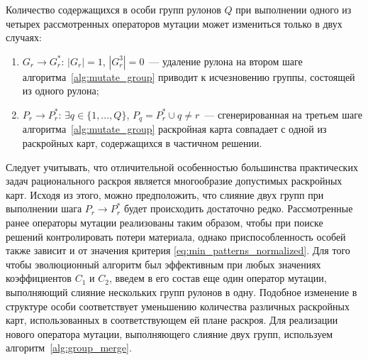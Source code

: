 \documentclass[12pt]{article}
\begin{document}
Количество содержащихся в особи групп рулонов $Q$ при выполнении одного из 
четырех рассмотренных операторов мутации может измениться только в двух 
случаях:
\begin{enumerate}
    \item $G_r \rightarrow G_r^*$: $|G_r|=1$, $|G_r^3|=0$~--- удаление рулона 
    на втором шаге алгоритма~\ref{alg:mutate_group} приводит к исчезновению 
    группы, состоящей из одного рулона;
    \item $P_r \rightarrow P_r^*$: $\exists q \in \{1,\ldots,Q\}$, 
        $P_q=P_r^* \cup q \neq r$~--- 
    сгенерированная на третьем шаге алгоритма~\ref{alg:mutate_group} 
    раскройная карта совпадает с одной из раскройных карт, содержащихся в 
    частичном решении.
\end{enumerate}

Следует учитывать, что отличительной особенностью большинства практических 
задач рационального раскроя является многообразие допустимых раскройных карт. 
Исходя из этого, можно предположить, что слияние двух групп при выполнении 
шага $P_r \rightarrow P_r^*$ будет происходить достаточно редко. Рассмотренные 
ранее операторы мутации реализованы таким образом, чтобы при поиске решений 
контролировать потери материала, однако приспособленность особей также зависит 
и от значения критерия 
\eqref{eq:min_patterns_normalized}. 
Для того чтобы эволюционный алгоритм был 
эффективным при любых значениях коэффициентов $C_1$ и $C_2$, введем в его 
состав еще один оператор мутации, выполняющий слияние нескольких групп рулонов 
в одну. Подобное изменение в структуре особи соответствует уменьшению 
количества различных раскройных карт, использованных в соответствующем ей 
плане раскроя. Для реализации нового оператора мутации, выполняющего слияние 
двух групп, используем алгоритм~\ref{alg:group_merge}.
\end{document}
